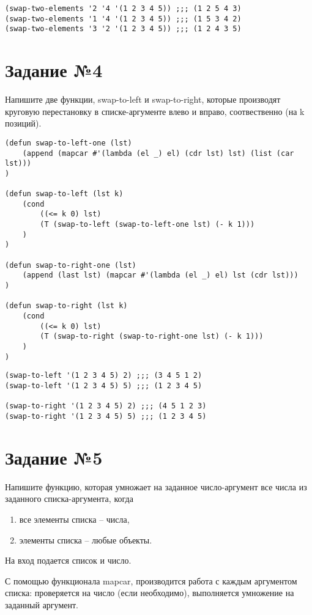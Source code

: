 \begin{lstlisting}
(swap-two-elements '2 '4 '(1 2 3 4 5)) ;;; (1 2 5 4 3)
(swap-two-elements '1 '4 '(1 2 3 4 5)) ;;; (1 5 3 4 2)
(swap-two-elements '3 '2 '(1 2 3 4 5)) ;;; (1 2 4 3 5)
\end{lstlisting}
\section{Задание №4}

Напишите две функции, swap-to-left и swap-to-right, которые производят круговую
перестановку в списке-аргументе влево и вправо, соотвественно (на k позиций).

\begin{lstlisting}
(defun swap-to-left-one (lst)
    (append (mapcar #'(lambda (el _) el) (cdr lst) lst) (list (car lst)))
)

(defun swap-to-left (lst k)
    (cond
        ((<= k 0) lst)
        (T (swap-to-left (swap-to-left-one lst) (- k 1)))
    )
)

(defun swap-to-right-one (lst)
    (append (last lst) (mapcar #'(lambda (el _) el) lst (cdr lst)))
)

(defun swap-to-right (lst k)
    (cond
        ((<= k 0) lst)
        (T (swap-to-right (swap-to-right-one lst) (- k 1)))
    )
)
\end{lstlisting}

\begin{lstlisting}
(swap-to-left '(1 2 3 4 5) 2) ;;; (3 4 5 1 2)
(swap-to-left '(1 2 3 4 5) 5) ;;; (1 2 3 4 5)

(swap-to-right '(1 2 3 4 5) 2) ;;; (4 5 1 2 3)
(swap-to-right '(1 2 3 4 5) 5) ;;; (1 2 3 4 5)
\end{lstlisting}

\section{Задание №5}

Напишите функцию, которая умножает на заданное число-аргумент
все числа из заданного списка-аргумента, когда

\begin{enumerate}
    \item все элементы списка -- числа,
    \item элементы списка -- любые объекты.
\end{enumerate}

На вход подается список и число.

С помощью функционала mapcar, производится работа с каждым аргументом списка: проверяется на число (если необходимо), выполняется умножение на заданный аргумент.


